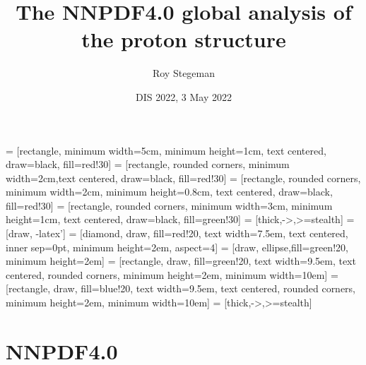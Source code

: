 \documentclass[aspectratio=169,9pt]{beamer}
\title{The NNPDF4.0 global analysis of the proton structure}
\date{DIS 2022, 3 May 2022}
\author{Roy Stegeman}
\institute{University of Milan and INFN Milan}
\begin{document}
{
\begin{frame}
  \titlepage
\end{frame}
}




\usetikzlibrary{shapes, arrows}
\usetikzlibrary{decorations.pathreplacing}
\usetikzlibrary{positioning, calc}
 = [rectangle, minimum width=5cm, minimum height=1cm, text centered, draw=black, fill=red!30]
 = [rectangle, rounded corners, minimum width=2cm,text centered, draw=black, fill=red!30]
 = [rectangle, rounded corners, minimum width=2cm, minimum height=0.8cm, text centered, draw=black, fill=red!30]
 = [rectangle, rounded corners, minimum width=3cm, minimum height=1cm, text centered, draw=black, fill=green!30]
 = [thick,->,>=stealth]
 =[draw, -latex']
 = [diamond, draw, fill=red!20, text width=7.5em, text centered,  inner sep=0pt, minimum height=2em, aspect=4]
 = [draw, ellipse,fill=green!20, minimum height=2em]
 = [rectangle, draw, fill=green!20, text width=9.5em, text centered, rounded corners, minimum height=2em, minimum width=10em]
=[rectangle, draw, fill=blue!20, text width=9.5em, 
                   text centered, rounded corners, minimum height=2em, 
                   minimum width=10em]
 = [thick,->,>=stealth]





\section*{NNPDF4.0}
\end{document}
